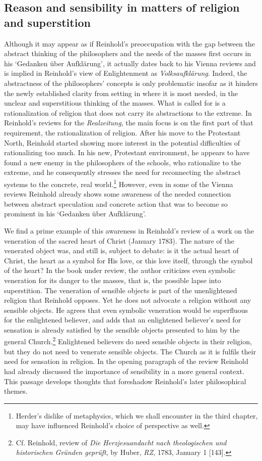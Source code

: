 \subsection{Reason and sensibility in matters of religion and superstition}


Although it may appear as if Reinhold's preoccupation with the gap between the abstract thinking of the philosophers and the needs of the masses first occurs in his `Gedanken \"{u}ber Aufkl\"{a}rung', it actually dates back to his Vienna reviews and is implied in Reinhold's view of Enlightenment as \textit{Volksaufkl\"{a}rung}. Indeed, the abstractness of the philosophers' concepts is only problematic insofar as it hinders the newly established clarity from setting in where it is most needed, in the unclear and superstitious thinking of the masses. What is called for is a rationalization of religion that does not carry its abstractions to the extreme. In Reinhold's reviews for the \textit{Realzeitung}, the main focus is on the first part of that requirement, the rationalization of religion. After his move to the Protestant North, Reinhold started showing more interest in the potential difficulties of rationalizing too much. In his new, Protestant environment, he appears to have found a new enemy in the philosophers of the schools, who rationalize to the extreme, and he consequently stresses the need for reconnecting the abstract systems to the concrete, real world.\footnote{ Herder's dislike of metaphysics, which we shall encounter in the third chapter, may have influenced Reinhold's choice of perspective as well. } However, even in some of the Vienna reviews Reinhold already shows some awareness of the needed connection between abstract speculation and concrete action that was to become so prominent in his `Gedanken \"{u}ber Aufkl\"{a}rung'. 

We find a prime example of this awareness in Reinhold's review of a work on the veneration of the sacred heart of Christ (January 1783). The nature of the venerated object was, and still is, subject to debate: is it the actual heart of Christ, the heart as a symbol for His love, or this love itself, through the symbol of the heart? In the book under review, the author criticizes even symbolic veneration for its danger to the masses, that is, the possible lapse into superstition. The veneration of sensible objects is part of the unenlightened religion that Reinhold opposes. Yet he does not advocate a religion without any sensible objects. He agrees that even symbolic veneration would be superfluous for the enlightened believer, and adds that an enlightened believer's need for sensation is already satisfied by the sensible objects presented to him by the general Church.\footnote{ Cf. Reinhold, review of \textit{Die Herzjesuandacht nach theologischen und historischen Gr\"{u}nden gepr\"{u}ft}, by Huber, \textit{RZ}, 1783, January 1 [143].} Enlightened believers do need sensible objects in their religion, but they do not need to venerate sensible objects. The Church as it is fulfils their need for sensation in religion. In the opening paragraph of the review Reinhold had already discussed the importance of sensibility in a more general context. This passage develops thoughts that foreshadow Reinhold's later philosophical themes.

